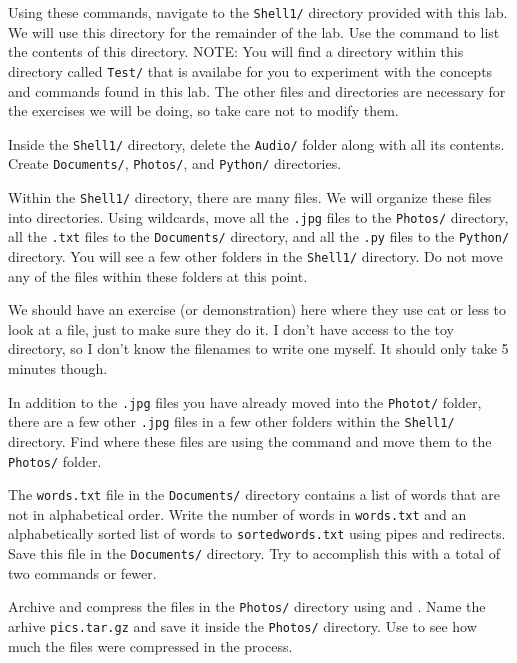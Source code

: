
Using these commands, navigate to the \texttt{Shell1/} directory provided with this lab. We will use this directory for the remainder of the lab. Use the  command to list the contents of this directory. NOTE: You will find a directory within this directory called \texttt{Test/} that is availabe for you to experiment with the concepts and commands found in this lab. The other files and directories are necessary for the exercises we will be doing, so take care not to modify them.

Inside the \texttt{Shell1/} directory, delete the \texttt{Audio/} folder along with all its contents.
Create \texttt{Documents/}, \texttt{Photos/}, and \texttt{Python/} directories.

Within the \texttt{Shell1/} directory, there are many files.
We will organize these files into directories.
Using wildcards, move all the \texttt{.jpg} files to the \texttt{Photos/} directory, all the \texttt{.txt} files to the \texttt{Documents/} directory, and all the \texttt{.py} files to the \texttt{Python/} directory.
You will see a few other folders in the \texttt{Shell1/} directory.
Do not move any of the files within these folders at this point.

We should have an exercise (or demonstration) here where they use cat or less to look at a file, just to make sure they do it.
I don't have access to the toy directory, so I don't know the filenames to write one myself.
It should only take 5 minutes though.

In addition to the \texttt{.jpg} files you have already moved into the \texttt{Photot/} folder, there are a few other \texttt{.jpg} files in a few other folders within the \texttt{Shell1/} directory.
Find where these files are using the  command and move them to the \texttt{Photos/} folder.

The \texttt{words.txt} file in the \texttt{Documents/} directory contains a list of words that are not in alphabetical order.
Write the number of words in \texttt{words.txt} and an alphabetically sorted list of words to \texttt{sortedwords.txt} using pipes and redirects.
Save this file in the \texttt{Documents/} directory.
Try to accomplish this with a total of two commands or fewer.

Archive and compress the files in the \texttt{Photos/} directory using  and . Name the arhive \texttt{pics.tar.gz} and save it inside the \texttt{Photos/} directory. Use  to see how much the files were compressed in the process.

